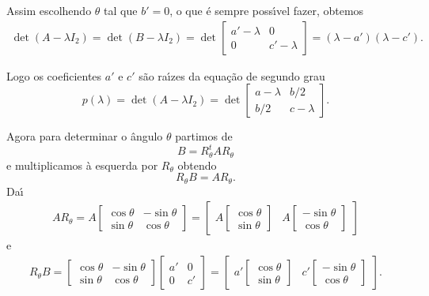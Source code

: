Assim escolhendo $\theta$ tal que $b' = 0$, o que \'e sempre poss{\'\i}vel fazer, obtemos
\begin{align*}
  \det(A - \lambda I_2) = \det(B - \lambda I_2) = \det \begin{bmatrix}
    a' - \lambda & 0\\
    0 & c' - \lambda
  \end{bmatrix} = (\lambda - a')(\lambda - c').
\end{align*}

Logo os coeficientes $a'$ e $c'$ s\~ao ra{\'\i}zes da equa\c{c}\~ao de segundo grau
\begin{equation}
  p(\lambda) = \det(A - \lambda I_2) = \det \begin{bmatrix}
    a - \lambda & b/2\\
    b/2 & c - \lambda
  \end{bmatrix}.
\end{equation}

Agora para determinar o \^angulo $\theta$ partimos de
\[
  B = R_\theta^t A R_\theta
\]
e multiplicamos \`a esquerda por $R_\theta$ obtendo
\[
  R_\theta B = AR_\theta.
\]
Da{\'\i}
\begin{align*}
  AR_\theta = A \begin{bmatrix}
    \cos\theta & -\sin\theta\\
    \sin\theta & \cos\theta
  \end{bmatrix} = \begin{bmatrix}
    A \begin{bmatrix}
      \cos\theta \\ \sin\theta
    \end{bmatrix} & A \begin{bmatrix}
      -\sin\theta\\ \cos\theta
    \end{bmatrix}
  \end{bmatrix}
\end{align*}
e
\begin{align*}
  R_\theta B = \begin{bmatrix}
    \cos\theta & -\sin\theta\\
    \sin\theta & \cos\theta
  \end{bmatrix} \begin{bmatrix}
    a' & 0\\
    0 & c'
  \end{bmatrix} = \begin{bmatrix}
    a' \begin{bmatrix}
      \cos\theta \\ \sin\theta
    \end{bmatrix} & c' \begin{bmatrix}
      -\sin\theta\\ \cos\theta
    \end{bmatrix}
  \end{bmatrix}.
\end{align*}

